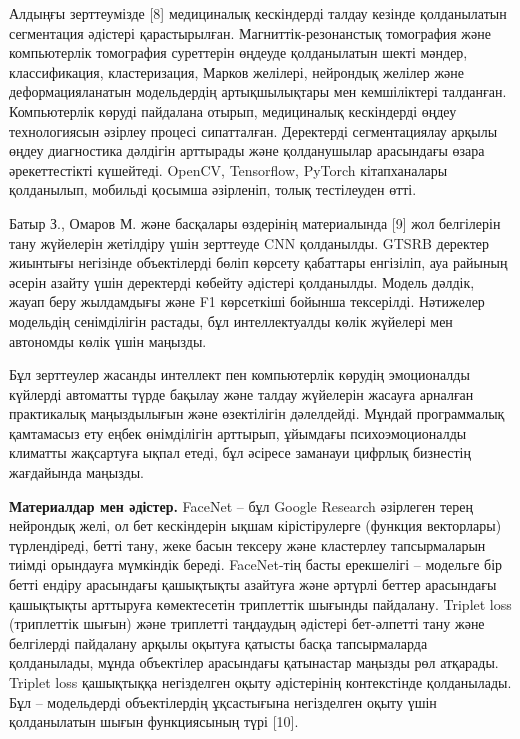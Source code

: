 \begin{multicols}{2}
Алдыңғы зерттеумізде {[}8{]} медициналық кескіндерді талдау кезінде
қолданылатын сегментация әдістері қарастырылған. Магниттік-резонанстық
томография және компьютерлік томография суреттерін өңдеуде қолданылатын
шекті мәндер, классификация, кластеризация, Марков желілері, нейрондық
желілер және деформацияланатын модельдердің артықшылықтары мен
кемшіліктері талданған. Компьютерлік көруді пайдалана отырып,
медициналық кескіндерді өңдеу технологиясын әзірлеу процесі сипатталған.
Деректерді сегментациялау арқылы өңдеу диагностика дәлдігін арттырады
және қолданушылар арасындағы өзара әрекеттестікті күшейтеді. OpenCV,
Tensorflow, PyTorch кітапханалары қолданылып, мобильді қосымша
әзірленіп, толық тестілеуден өтті.

Батыр З., Омаров М. және басқалары өздерінің материалында {[}9{]} жол
белгілерін тану жүйелерін жетілдіру үшін зерттеуде CNN қолданылды. GTSRB
деректер жиынтығы негізінде объектілерді бөліп көрсету қабаттары
енгізіліп, ауа райының әсерін азайту үшін деректерді көбейту әдістері
қолданылды. Модель дәлдік, жауап беру жылдамдығы және F1 көрсеткіші
бойынша тексерілді. Нәтижелер модельдің сенімділігін растады, бұл
интеллектуалды көлік жүйелері мен автономды көлік үшін маңызды.

Бұл зерттеулер жасанды интеллект пен компьютерлік көрудің эмоционалды
күйлерді автоматты түрде бақылау және талдау жүйелерін жасауға арналған
практикалық маңыздылығын және өзектілігін дәлелдейді. Мұндай
программалық қамтамасыз ету еңбек өнімділігін арттырып, ұйымдағы
психоэмоционалды климатты жақсартуға ықпал етеді, бұл әсіресе заманауи
цифрлық бизнестің жағдайында маңызды.

{\bfseries Материалдар мен әдістер.} FaceNet -- бұл Google Research
әзірлеген терең нейрондық желі, ол бет кескіндерін ықшам кірістірулерге
(функция векторлары) түрлендіреді, бетті тану, жеке басын тексеру және
кластерлеу тапсырмаларын тиімді орындауға мүмкіндік береді. FaceNet-тің
басты ерекшелігі -- модельге бір бетті ендіру арасындағы қашықтықты
азайтуға және әртүрлі беттер арасындағы қашықтықты арттыруға
көмектесетін триплеттік шығынды пайдалану. Triplet loss (триплеттік
шығын) және триплетті таңдаудың әдістері бет-әлпетті тану және
белгілерді пайдалану арқылы оқытуға қатысты басқа тапсырмаларда
қолданылады, мұнда объектілер арасындағы қатынастар маңызды рөл
атқарады. Triplet loss қашықтыққа негізделген оқыту әдістерінің
контекстінде қолданылады. Бұл -- модельдерді объектілердің ұқсастығына
негізделген оқыту үшін қолданылатын шығын функциясының түрі {[}10{]}.


\end{multicols}
